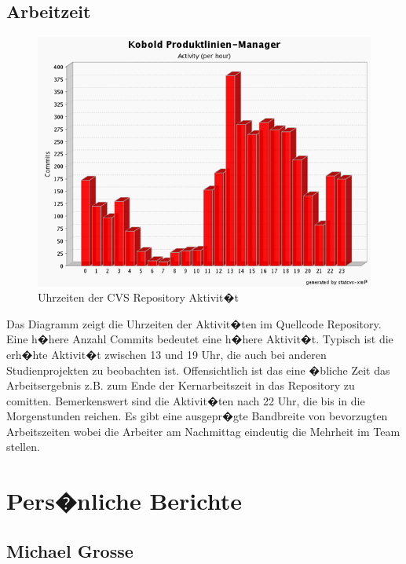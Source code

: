 \documentclass[a4paper,titlepage,12pt,ngerman]{scrbook}
\begin{document}
\section{Arbeitzeit}

\begin{figure}[h!]
  \centering
  \includegraphics[width=15cm]{praesentation/commit_by_hour}
  \caption{Uhrzeiten der CVS Repository Aktivit�t}
\end{figure}

Das Diagramm zeigt die Uhrzeiten der Aktivit�ten im Quellcode
Repository. Eine h�here Anzahl Commits bedeutet eine h�here
Aktivit�t. Typisch ist die erh�hte Aktivit�t zwischen 13 und 19 Uhr,
die auch bei anderen Studienprojekten zu beobachten
ist. Offensichtlich ist das eine �bliche Zeit das Arbeitsergebnis z.B.
zum Ende der Kernarbeitszeit in das Repository zu
comitten. Bemerkenswert sind die Aktivit�ten nach 22 Uhr, die bis in
die Morgenstunden reichen. Es gibt eine ausgepr�gte
Bandbreite von bevorzugten Arbeitszeiten wobei die Arbeiter am Nachmittag
eindeutig die Mehrheit im Team stellen. 


\chapter{Pers�nliche Berichte}


\section{Michael Grosse}
\end{document}
